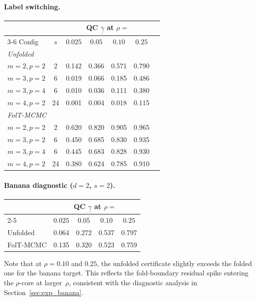 \paragraph{Label switching.}

\begin{center}
\begin{tabular}{lcccccc}
\hline
& & \multicolumn{4}{c}{QC $\underline{\gamma}$ at $\rho =$} \\
\cline{3-6}
Config & $s$ & $0.025$ & $0.05$ & $0.10$ & $0.25$ \\
\hline
\multicolumn{6}{l}{\textit{Unfolded}} \\
$m{=}2, p{=}2$ & 2  & 0.142 & 0.366 & 0.571 & 0.790 \\
$m{=}3, p{=}2$ & 6  & 0.019 & 0.066 & 0.185 & 0.486 \\
$m{=}3, p{=}4$ & 6  & 0.010 & 0.036 & 0.111 & 0.380 \\
$m{=}4, p{=}2$ & 24 & 0.001 & 0.004 & 0.018 & 0.115 \\
\hline
\multicolumn{6}{l}{\textit{FolT-MCMC}} \\
$m{=}2, p{=}2$ & 2  & 0.620 & 0.820 & 0.905 & 0.965 \\
$m{=}3, p{=}2$ & 6  & 0.450 & 0.685 & 0.830 & 0.935 \\
$m{=}3, p{=}4$ & 6  & 0.445 & 0.683 & 0.828 & 0.930 \\
$m{=}4, p{=}2$ & 24 & 0.380 & 0.624 & 0.785 & 0.910 \\
\hline
\end{tabular}
\end{center}

\paragraph{Banana diagnostic ($d = 2$, $s = 2$).}

\begin{center}
\begin{tabular}{lcccc}
\hline
& \multicolumn{4}{c}{QC $\underline{\gamma}$ at $\rho =$} \\
\cline{2-5}
& $0.025$ & $0.05$ & $0.10$ & $0.25$ \\
\hline
Unfolded  & 0.064 & 0.272 & 0.537 & 0.797 \\
FolT-MCMC & 0.135 & 0.320 & 0.523 & 0.759 \\
\hline
\end{tabular}
\end{center}

Note that at $\rho = 0.10$ and $0.25$, the unfolded certificate
slightly exceeds the folded one for the banana target.  This
reflects the fold-boundary residual spike entering the
$\rho$-core at larger~$\rho$, consistent with the diagnostic
analysis in Section~\ref{sec:exp_banana}.



